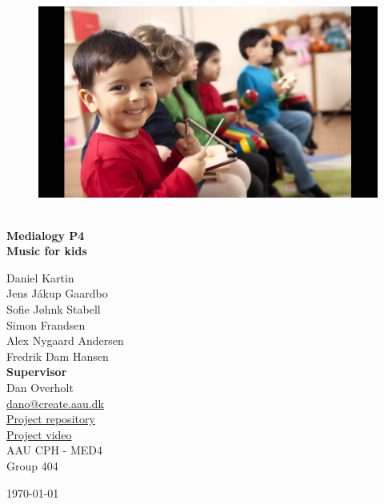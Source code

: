 \begin{titlepage}
			
\addtolength{\voffset}{2cm}

\begin{figure}[H]
\centering
\vspace{2cm}	%
\includegraphics[width=0.99\linewidth]{figure/Frontpage/frontpage}
\end{figure}

\mbox{}
\vfill
\renewcommand{\familydefault}{\sfdefault} \normalfont %
\HRule\\[0.1cm]
\textbf{{\small Medialogy P4\\ {\Huge Music for kids}}} \hspace{0.15cm}\\
\HRule\smallskip{}
\begin{multicols}{2}
{\Large Daniel Kartin\\Jens Jákup Gaardbo\\Sofie Jøhnk Stabell\\Simon Frandsen\\Alex Nygaard Andersen\\Fredrik Dam Hansen\columnbreak}\\
\setlength{\parskip}{2.4cm}
{\Large{\textbf{Supervisor}\\Dan Overholt\\\href{mailto:dano@create.aau.dk}{dano@create.aau.dk}}}\medskip\\
\href{https://github.com/totalfreak/medialogyp4code}{Project repository}\\
\href{https://youtube.com}{Project video}\medskip
\\\small AAU CPH - 
MED4 \\
Group 404\\
\end{multicols}
\today
\renewcommand{\familydefault}{\rmdefault} \normalfont %
\end{titlepage}


